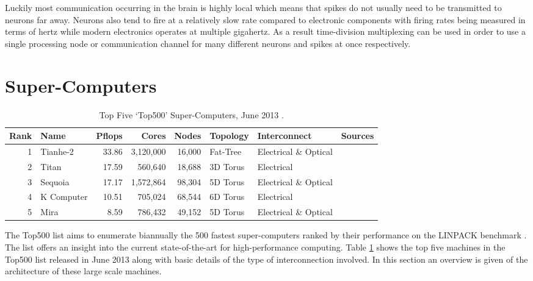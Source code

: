 			Luckily most communication occurring in the brain is highly local which
			means that spikes do not usually need to be transmitted to neurons far
			away. Neurons also tend to fire at a relatively slow rate compared to
			electronic components with firing rates being measured in terms of hertz
			while modern electronics operates at multiple gigahertz. As a result
			time-division multiplexing can be used in order to use a single processing
			node or communication channel for many different neurons and spikes at
			once respectively.
	
	
	\section{Super-Computers}
		
		\label{sec:super-computers}
		
		\begin{table}
			\center
			\begin{tabular}{r l r r r l l l}
				\toprule
				Rank & Name    & Pflops& Cores  & Nodes  & Topology & Interconnect          & Sources \\
				\midrule                          
				1 & Tianhe-2   & 33.86 & 3,120,000 & 16,000 & Fat-Tree & Electrical \& Optical & \cite{dongarra13} \\
				2 & Titan      & 17.59 & 560,640   & 18,688 & 3D Torus & Electrical            & \cite{bland12} \\
				3 & Sequoia    & 17.17 & 1,572,864 & 98,304 & 5D Torus & Electrical \& Optical & \cite{prickett10} \\
				4 & K Computer & 10.51 & 705,024   & 68,544 & 6D Torus & Electrical            & \cite{fujitsu11,yokokawa11} \\
				5 & Mira       &  8.59 & 786,432   & 49,152 & 5D Torus & Electrical \& Optical & \cite{prickett10} \\
				\bottomrule
			\end{tabular}
			
			\caption{Top Five `Top500' Super-Computers, June 2013 \cite{meuer13}.}
			\label{tab:top500}
		\end{table}
		
		The Top500 list \cite{meuer13} aims to enumerate biannually the 500 fastest
		super-computers ranked by their performance on the LINPACK benchmark
		\cite{dongarraLINPAC}. The list offers an insight into the current
		state-of-the-art for high-performance computing. Table \ref{tab:top500}
		shows the top five machines in the Top500 list released in June 2013 along
		with basic details of the type of interconnection involved. In this section
		an overview is given of the architecture of these large scale machines.
		
